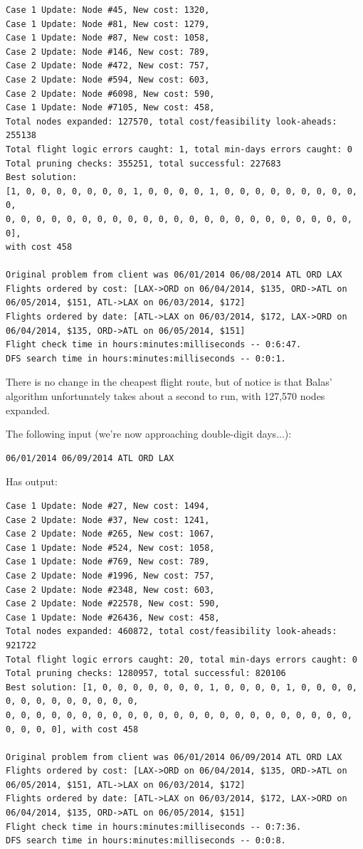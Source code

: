 \documentclass{article}
\begin{document}
\scriptsize
\begin{verbatim}
Case 1 Update: Node #45, New cost: 1320, 
Case 1 Update: Node #81, New cost: 1279, 
Case 1 Update: Node #87, New cost: 1058, 
Case 2 Update: Node #146, New cost: 789, 
Case 2 Update: Node #472, New cost: 757, 
Case 2 Update: Node #594, New cost: 603, 
Case 2 Update: Node #6098, New cost: 590, 
Case 1 Update: Node #7105, New cost: 458, 
Total nodes expanded: 127570, total cost/feasibility look-aheads: 255138
Total flight logic errors caught: 1, total min-days errors caught: 0
Total pruning checks: 355251, total successful: 227683
Best solution:
[1, 0, 0, 0, 0, 0, 0, 0, 1, 0, 0, 0, 0, 1, 0, 0, 0, 0, 0, 0, 0, 0, 0, 0,
0, 0, 0, 0, 0, 0, 0, 0, 0, 0, 0, 0, 0, 0, 0, 0, 0, 0, 0, 0, 0, 0, 0, 0],
with cost 458

Original problem from client was 06/01/2014 06/08/2014 ATL ORD LAX
Flights ordered by cost: [LAX->ORD on 06/04/2014, $135, ORD->ATL on 06/05/2014, $151, ATL->LAX on 06/03/2014, $172]
Flights ordered by date: [ATL->LAX on 06/03/2014, $172, LAX->ORD on 06/04/2014, $135, ORD->ATL on 06/05/2014, $151]
Flight check time in hours:minutes:milliseconds -- 0:6:47.
DFS search time in hours:minutes:milliseconds -- 0:0:1.
\end{verbatim}
\normalsize

There is no change in the cheapest flight route, but of notice is that Balas' algorithm unfortunately takes about a second to run, with 127,570 nodes
expanded.

The following input (we're now approaching double-digit days...):

\begin{verbatim}
06/01/2014 06/09/2014 ATL ORD LAX
\end{verbatim}

Has output:

\scriptsize
\begin{verbatim}
Case 1 Update: Node #27, New cost: 1494, 
Case 2 Update: Node #37, New cost: 1241, 
Case 2 Update: Node #265, New cost: 1067, 
Case 1 Update: Node #524, New cost: 1058, 
Case 1 Update: Node #769, New cost: 789, 
Case 2 Update: Node #1996, New cost: 757, 
Case 2 Update: Node #2348, New cost: 603, 
Case 2 Update: Node #22578, New cost: 590, 
Case 1 Update: Node #26436, New cost: 458, 
Total nodes expanded: 460872, total cost/feasibility look-aheads: 921722
Total flight logic errors caught: 20, total min-days errors caught: 0
Total pruning checks: 1280957, total successful: 820106
Best solution: [1, 0, 0, 0, 0, 0, 0, 0, 1, 0, 0, 0, 0, 1, 0, 0, 0, 0, 0, 0, 0, 0, 0, 0, 0, 0, 0,
0, 0, 0, 0, 0, 0, 0, 0, 0, 0, 0, 0, 0, 0, 0, 0, 0, 0, 0, 0, 0, 0, 0, 0, 0, 0, 0], with cost 458

Original problem from client was 06/01/2014 06/09/2014 ATL ORD LAX
Flights ordered by cost: [LAX->ORD on 06/04/2014, $135, ORD->ATL on 06/05/2014, $151, ATL->LAX on 06/03/2014, $172]
Flights ordered by date: [ATL->LAX on 06/03/2014, $172, LAX->ORD on 06/04/2014, $135, ORD->ATL on 06/05/2014, $151]
Flight check time in hours:minutes:milliseconds -- 0:7:36.
DFS search time in hours:minutes:milliseconds -- 0:0:8.
\end{verbatim}
\normalsize
\end{document}
